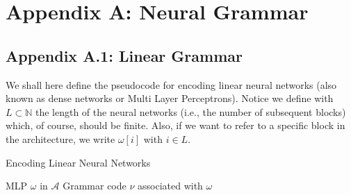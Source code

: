 \documentclass[12pt]{article}
\begin{document}
\section{Appendix A: Neural Grammar}
\subsection{Appendix A.1: Linear Grammar}

We shall here define the pseudocode for encoding linear neural networks (also known as dense networks or 
Multi Layer Perceptrons). Notice we define with \( L \subset \mathbb{N} \) the length of the neural 
networks (i.e., the number of subsequent blocks) which, of course, should be finite. Also, if we want 
to refer to a specific block in the architecture, we write \( \omega[i] \) with \( i \in L \).

\begin{algorithm}
    \caption{Encoding Linear Neural Networks}\label{alg:encoding}
    \begin{algorithmic}[1]
        \Input MLP \( \omega \) in \( \mathcal{A} \) 
        \Output Grammar code \( \nu \) associated with \( \omega \) 
             
            \EndIf
        \EndFor
    \end{algorithmic}
\end{algorithm}
\end{document}
